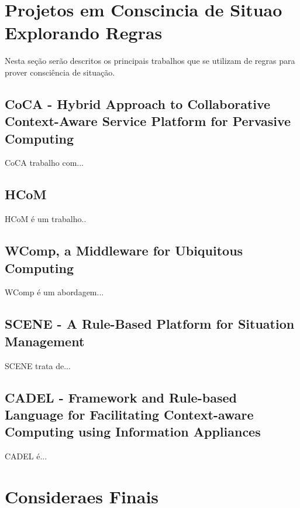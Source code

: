\documentclass[12pt,a4paper,compsoc]{IEEEtran}
\begin{document}

\section{Projetos em Conscincia de Situao Explorando Regras}

Nesta seção serão descritos os principais trabalhos que se utilizam de regras para prover consciência de situação.

\subsection{CoCA - Hybrid Approach to Collaborative Context-Aware Service Platform for Pervasive Computing}

CoCA trabalho com...

\subsection{HCoM}

HCoM é um trabalho..

\subsection{WComp, a Middleware for Ubiquitous Computing}

WComp é um abordagem...

\subsection{SCENE - A Rule-Based Platform for Situation Management}

SCENE trata de...

\subsection{CADEL - Framework and Rule-based Language for Facilitating Context-aware Computing using Information Appliances}

CADEL é...


\section{Consideraes Finais}
\end{document}

